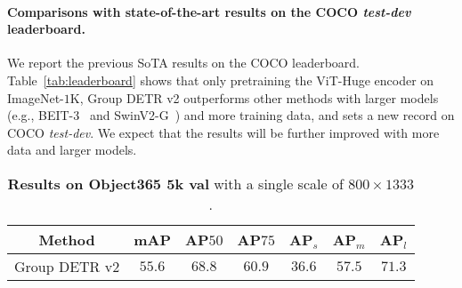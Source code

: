 \documentclass[10pt,twocolumn,letterpaper]{article}
\begin{document}
\paragraph{Comparisons with state-of-the-art results on the COCO {\em test-dev} leaderboard.} 
We report the previous SoTA results on the COCO leaderboard. Table~\ref{tab:leaderboard} shows that only pretraining the ViT-Huge encoder on ImageNet-$1$K, Group DETR v2 outperforms other methods with larger models ({e.g.}, BEIT-3~\cite{wang2022image} and SwinV2-G~\cite{liu2022swin}) and more training data, and sets a new record on COCO {\em test-dev}. 
We expect that the results will be further improved with more data and larger models.

\begin{table}
  \centering
    \setlength{\tabcolsep}{5pt}
    \renewcommand{\arraystretch}{1.3}
    \footnotesize    
  \caption{\textbf{Results on Object365 $\textbf{5}$k val} with a single scale of $800\times 1333$.}
  \begin{tabular}{c|cccccc}
    \toprule
    Method &  mAP & AP$50$ &  AP$75$ & AP$_s$ & AP$_m$ & AP$_l$ \\
    \midrule
    Group DETR v2  & $\mathbf{55.6}$ & $68.8$ & $60.9$ & $36.6$ & $57.5$ & $71.3$ \\
    \bottomrule
  \end{tabular}
  \label{tab:o365}
\end{table}



{\small


}
\end{document}
